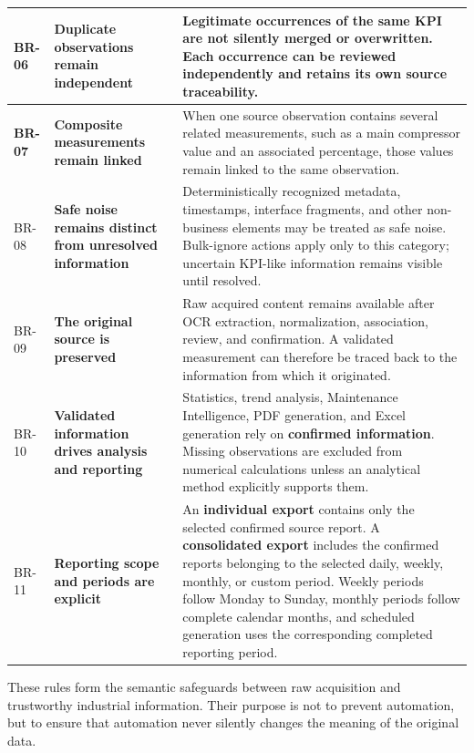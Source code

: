 \begin{longtable}{
    |>{\centering\arraybackslash\bfseries}p{}
    |>{\raggedright\arraybackslash\bfseries}p{}
    |>{\raggedright\arraybackslash}p{}|
}
BR-06
&
Duplicate observations remain independent
&
Legitimate occurrences of the same KPI are not silently merged or
overwritten. Each occurrence can be reviewed independently and retains its own
source traceability.
\\
\hline

BR-07
&
Composite measurements remain linked
&
When one source observation contains several related measurements, such as a
main compressor value and an associated percentage, those values remain
linked to the same observation.
\\
\hline

BR-08
&
Safe noise remains distinct from unresolved information
&
Deterministically recognized metadata, timestamps, interface fragments, and
other non-business elements may be treated as safe noise. Bulk-ignore actions
apply only to this category; uncertain KPI-like information remains visible
until resolved.
\\
\hline

BR-09
&
The original source is preserved
&
Raw acquired content remains available after OCR extraction, normalization,
association, review, and confirmation. A validated measurement can therefore
be traced back to the information from which it originated.
\\
\hline

BR-10
&
Validated information drives analysis and reporting
&
Statistics, trend analysis, Maintenance Intelligence, PDF generation, and
Excel generation rely on \textbf{confirmed information}. Missing observations
are excluded from numerical calculations unless an analytical method
explicitly supports them.
\\
\hline

BR-11
&
Reporting scope and periods are explicit
&
An \textbf{individual export} contains only the selected confirmed source
report. A \textbf{consolidated export} includes the confirmed reports belonging
to the selected daily, weekly, monthly, or custom period. Weekly periods follow
Monday to Sunday, monthly periods follow complete calendar months, and
scheduled generation uses the corresponding completed reporting period.
\\
\hline

\end{longtable}

These rules form the semantic safeguards between raw acquisition and
trustworthy industrial information. Their purpose is not to prevent
automation, but to ensure that automation never silently changes the meaning
of the original data.


